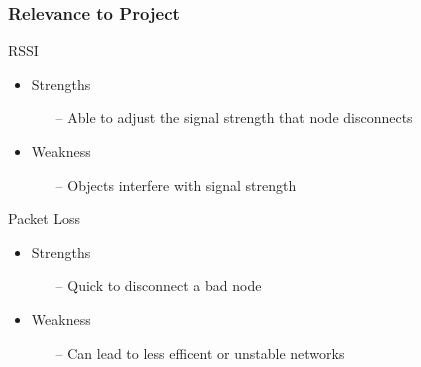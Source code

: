 \begin{frame}[t]
  \frametitle{Relevance to Project}
  
  RSSI
  \begin{itemize}
  \item Strengths
    \begin{itemize}
      \item[--] Able to adjust the signal strength that node disconnects
    \end{itemize}
  \item Weakness
    \begin{itemize}
      \item[--] Objects interfere with signal strength
    \end{itemize}
  \end{itemize}

  \vfill

  Packet Loss
  \begin{itemize}
  \item Strengths
    \begin{itemize}
      \item[--] Quick to disconnect a bad node
    \end{itemize}
  \item Weakness
    \begin{itemize}
      \item[--] Can lead to less efficent or unstable networks
    \end{itemize}
  \end{itemize}

  \vfill
  
  \begin{flushleft}
    \begin{tiny}
      \begin{minipage}{1.0\linewidth}
      \end{minipage}
    \end{tiny}
  \end{flushleft}

\end{frame}
